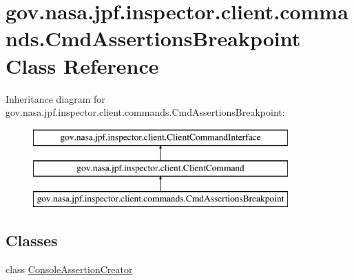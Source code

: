 \hypertarget{classgov_1_1nasa_1_1jpf_1_1inspector_1_1client_1_1commands_1_1_cmd_assertions_breakpoint}{}\section{gov.\+nasa.\+jpf.\+inspector.\+client.\+commands.\+Cmd\+Assertions\+Breakpoint Class Reference}
\label{classgov_1_1nasa_1_1jpf_1_1inspector_1_1client_1_1commands_1_1_cmd_assertions_breakpoint}
Inheritance diagram for gov.\+nasa.\+jpf.\+inspector.\+client.\+commands.\+Cmd\+Assertions\+Breakpoint\+:\begin{figure}[H]
\begin{center}
\leavevmode
\includegraphics[height=3.000000cm]{classgov_1_1nasa_1_1jpf_1_1inspector_1_1client_1_1commands_1_1_cmd_assertions_breakpoint}
\end{center}
\end{figure}
\subsection*{Classes}
\begin{DoxyCompactItemize}
\item 
class \hyperlink{classgov_1_1nasa_1_1jpf_1_1inspector_1_1client_1_1commands_1_1_cmd_assertions_breakpoint_1_1_console_assertion_creator}{Console\+Assertion\+Creator}
\end{DoxyCompactItemize}

